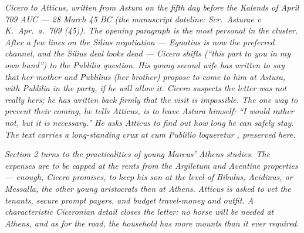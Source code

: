 
\textit{Cicero to Atticus, written from Astura on the
fifth day before the Kalends of April 709 AUC ---
28 March 45 BC (the manuscript dateline:
\textit{Scr.\ Asturae v K.\ Apr.\ a.\ 709 (45)}). The
opening paragraph is the most personal in the
cluster. After a few lines on the Silius
negotiation --- Egnatius is now the preferred
channel, and the Silius deal looks dead --- Cicero
shifts (``this part to you in my own hand'') to the
Publilia question. His young second wife has
written to say that her mother and Publilius (her
brother) propose to come to him at Astura, with
Publilia in the party, if he will allow it. Cicero
suspects the letter was not really hers; he has
written back firmly that the visit is impossible.
The one way to prevent their coming, he tells
Atticus, is to leave Astura himself: ``I would
rather not, but it is necessary.'' He asks Atticus
to find out how long he can safely stay. The
text carries a long-standing crux at \dag cum
Publilio loqueretur \dag, preserved here.}

\textit{Section 2 turns to the practicalities of
young Marcus' Athens studies. The expenses are to
be capped at the rents from the Argiletum and
Aventine properties --- enough, Cicero promises, to
keep his son at the level of Bibulus, Acidinus, or
Messalla, the other young aristocrats then at
Athens. Atticus is asked to vet the tenants, secure
prompt payers, and budget travel-money and outfit.
A characteristic Ciceronian detail closes the
letter: no horse will be needed at Athens, and as
for the road, the household has more mounts than it
ever required.}
